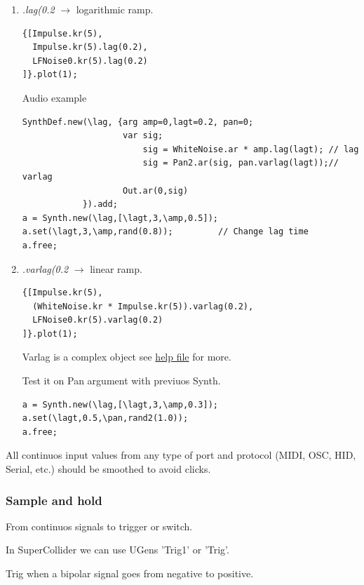 \begin{enumerate}
\def\labelenumi{\arabic{enumi}.}
\tightlist
\item \textit{.lag(0.2} \(\rightarrow\) logarithmic ramp.
    \begin{lstlisting}[frame=single] 
{[Impulse.kr(5), 
  Impulse.kr(5).lag(0.2),
  LFNoise0.kr(5).lag(0.2)
]}.plot(1);
\end{lstlisting}
    
    Audio example
    \begin{lstlisting}[frame=single] 
SynthDef.new(\lag, {arg amp=0,lagt=0.2, pan=0;
                    var sig;
                        sig = WhiteNoise.ar * amp.lag(lagt); // lag
                        sig = Pan2.ar(sig, pan.varlag(lagt));// varlag
                    Out.ar(0,sig)
            }).add;     
a = Synth.new(\lag,[\lagt,3,\amp,0.5]); 
a.set(\lagt,3,\amp,rand(0.8));         // Change lag time
a.free;
\end{lstlisting}

\item \textit{.varlag(0.2} \(\rightarrow\) linear ramp.
    \begin{lstlisting}[frame=single] 
{[Impulse.kr(5), 
  (WhiteNoise.kr * Impulse.kr(5)).varlag(0.2),
  LFNoise0.kr(5).varlag(0.2)
]}.plot(1);
\end{lstlisting}
    
Varlag is a complex object see \href{http://doc.sccode.org/Classes/VarLag.html} {help file} for more.

Test it on Pan argument with previuos Synth.

    \begin{lstlisting}[frame=single] 
a = Synth.new(\lag,[\lagt,3,\amp,0.3]);
a.set(\lagt,0.5,\pan,rand2(1.0));
a.free;
\end{lstlisting}   
\end{enumerate}

All continuos input values from any type of port and protocol (MIDI, OSC, HID, Serial, etc.) should be smoothed to avoid clicks.

\subsubsection{Sample and hold}\label{sample-and-hold}

From continuos signals to trigger or switch.

In SuperCollider we can use UGens 'Trig1' or 'Trig'.

Trig when a bipolar signal goes from negative to positive.

